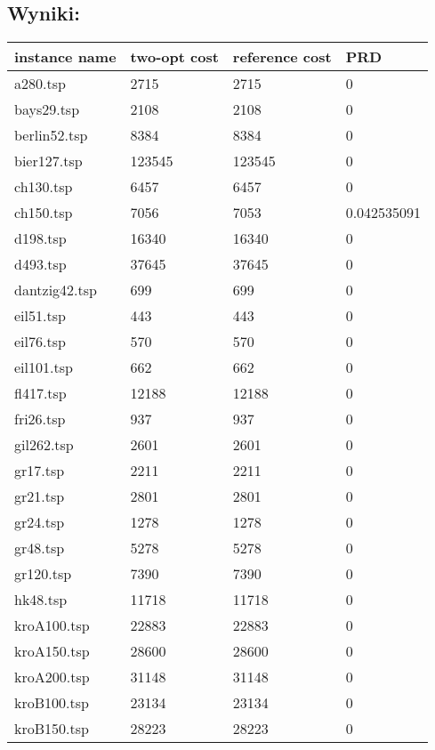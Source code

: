 \subsection{Wyniki: }
\begin{table}[H]
  \centering
  \begin{tabular}{|l|l|l|l|}
  \hline
      instance name & two-opt cost & reference cost & PRD \\ \hline \hline
      a280.tsp & 2715 & 2715 & 0 \\ \hline
      bays29.tsp & 2108 & 2108 & 0 \\ \hline
      berlin52.tsp & 8384 & 8384 & 0 \\ \hline
      bier127.tsp & 123545 & 123545 & 0 \\ \hline
      ch130.tsp & 6457 & 6457 & 0 \\ \hline
      ch150.tsp & 7056 & 7053 & 0.042535091 \\ \hline
      d198.tsp & 16340 & 16340 & 0 \\ \hline
      d493.tsp & 37645 & 37645 & 0 \\ \hline
      dantzig42.tsp & 699 & 699 & 0 \\ \hline
      eil51.tsp & 443 & 443 & 0 \\ \hline
      eil76.tsp & 570 & 570 & 0 \\ \hline
      eil101.tsp & 662 & 662 & 0 \\ \hline
      fl417.tsp & 12188 & 12188 & 0 \\ \hline
      fri26.tsp & 937 & 937 & 0 \\ \hline
      gil262.tsp & 2601 & 2601 & 0 \\ \hline
      gr17.tsp & 2211 & 2211 & 0 \\ \hline
      gr21.tsp & 2801 & 2801 & 0 \\ \hline
      gr24.tsp & 1278 & 1278 & 0 \\ \hline
      gr48.tsp & 5278 & 5278 & 0 \\ \hline
      gr120.tsp & 7390 & 7390 & 0 \\ \hline
      hk48.tsp & 11718 & 11718 & 0 \\ \hline
      kroA100.tsp & 22883 & 22883 & 0 \\ \hline
      kroA150.tsp & 28600 & 28600 & 0 \\ \hline
      kroA200.tsp & 31148 & 31148 & 0 \\ \hline
      kroB100.tsp & 23134 & 23134 & 0 \\ \hline
      kroB150.tsp & 28223 & 28223 & 0 \\ \hline

\end{tabular}
\end{table}
